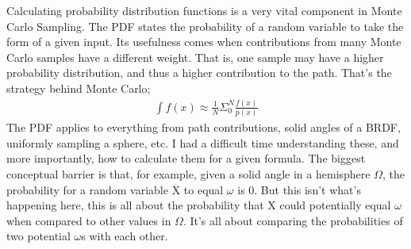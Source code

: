 \documentclass{article}
\begin{document}
    Calculating probability distribution functions is a very vital component in
    Monte Carlo Sampling. The PDF states the probability of a random variable to
    take the form of a given input. Its usefulness comes when contributions from
    many Monte Carlo samples have a different weight. That is, one sample may
    have a higher probability distribution, and thus a higher contribution to
    the path. That's the strategy behind Monte Carlo;
    \begin{align}
      \int f(x) \approx \frac{1}{N}\Sigma_0^N\frac{f(x)}{p(x)}
    \end{align}
    The PDF applies to everything from path contributions, solid angles of a
    BRDF, uniformly sampling a sphere, etc. I had a difficult time understanding
    these, and more importantly, how to calculate them for a given formula. The
    biggest conceptual barrier is that, for example, given a solid angle in a
    hemisphere $\Omega$, the probability for a random variable X to equal
    $\omega$ is 0. But this isn't what's happening here, this is all about the
    probability that X could potentially equal $\omega$ when compared to other values
    in $\Omega$. It's all about comparing the probabilities of two potential
    $\omega$s with each other.
\end{document}
